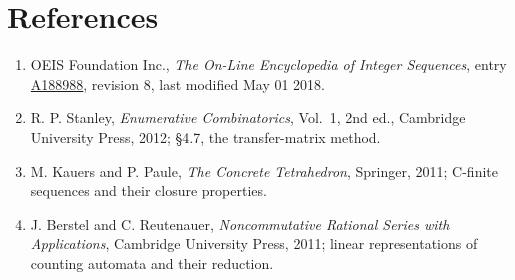 \documentclass[11pt]{article}
\theoremstyle{definition}
\begin{document}
\section{References}

\begin{enumerate}

\item OEIS Foundation Inc., \emph{The On-Line Encyclopedia of Integer Sequences}, entry \href{https://oeis.org/A188988}{A188988}, revision 8, last modified May 01 2018.

\item R. P. Stanley, \emph{Enumerative Combinatorics}, Vol.~1, 2nd ed., Cambridge University Press, 2012; \S4.7, the transfer-matrix method.

\item M. Kauers and P. Paule, \emph{The Concrete Tetrahedron}, Springer, 2011; C-finite sequences and their closure properties.

\item J. Berstel and C. Reutenauer, \emph{Noncommutative Rational Series with Applications}, Cambridge University Press, 2011; linear representations of counting automata and their reduction.

\end{enumerate}
\end{document}
